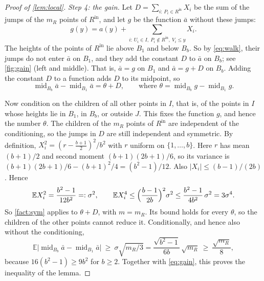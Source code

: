 \documentclass[11pt,letterpaper]{article}
\newcommand{\E}{\mathbb{E}}
\newcommand{\1}{\mathbf{1}}
\newcommand{\midp}{\operatorname{mid}}
\newcommand{\Rin}{R^{\mathrm{in}}}
\begin{document}
\begin{proof}[Proof of \cref{lem:local}]
\emph{Step 4: the gain.} Let $D=\sum_{i:\,P_i\in\Rin}X_i$ be the sum of the jumps of the $m_R$ points of $\Rin$, and let $g$ be the function $\bar a$ without these jumps:
\[
g(y)=a(y)+\sum_{i:\,U_i\in I,\ P_i\notin\Rin,\ V_i\le y}X_i.
\]
The heights of the points of $\Rin$ lie above $B_1$ and below $B_b$. So by \eqref{eq:walk}, their jumps do not enter $\bar a$ on $B_1$, and they add the constant $D$ to $\bar a$ on $B_b$; see \cref{fig:gain} (left and middle). That is, $\bar a=g$ on $B_1$ and $\bar a=g+D$ on $B_b$. Adding the constant $D$ to a function adds $D$ to its midpoint, so
\[
\midp_{B_b}\bar a-\midp_{B_1}\bar a=\theta+D,\qquad\text{where }\theta=\midp_{B_b}g-\midp_{B_1}g.
\]

Now condition on the children of all other points in $I$, that is, of the points in $I$ whose heights lie in $B_1$, in $B_b$, or outside $J$. This fixes the function $g$, and hence the number $\theta$. The children of the $m_R$ points of $\Rin$ are independent of the conditioning, so the jumps in $D$ are still independent and symmetric. By definition, $X_i^2=(r-\frac{b+1}2)^2/b^2$ with $r$ uniform on $\{1,\dots,b\}$. Here $r$ has mean $(b+1)/2$ and second moment $(b+1)(2b+1)/6$, so its variance is $(b+1)(2b+1)/6-(b+1)^2/4=(b^2-1)/12$. Also $|X_i|\le(b-1)/(2b)$. Hence
\[
\E X_i^2=\frac{b^2-1}{12b^2}=:\sigma^2,\qquad\E X_i^4\le\Bigl(\frac{b-1}{2b}\Bigr)^2\sigma^2\le\frac{b^2-1}{4b^2}\,\sigma^2=3\sigma^4.
\]
So \cref{fact:sym} applies to $\theta+D$, with $m=m_R$. Its bound holds for every $\theta$, so the children of the other points cannot reduce it. Conditionally, and hence also without the conditioning,
\[
\E\bigl|\midp_{B_b}\bar a-\midp_{B_1}\bar a\bigr|\ \ge\ \sigma\sqrt{m_R/3}=\frac{\sqrt{b^2-1}}{6b}\,\sqrt{m_R}\ \ge\ \frac{\sqrt{m_R}}8,
\]
because $16(b^2-1)\ge9b^2$ for $b\ge2$. Together with \eqref{eq:gain}, this proves the inequality of the lemma.
\end{proof}
\end{document}
